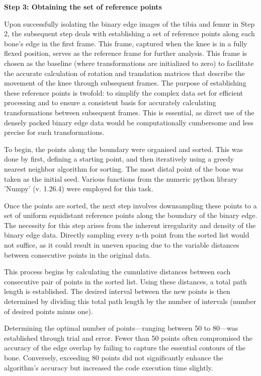 \documentclass{micro-econ-thesis}
\begin{document}
\textbf{Step 3: Obtaining the set of reference points}

Upon successfully isolating the binary edge images of the tibia and femur in Step 2, the subsequent step deals with establishing a set of reference points along each bone's edge in the first frame. This frame, captured when the knee is in a fully flexed position, serves as the reference frame for further analysis.  This frame is chosen as the baseline (where transformations are initialized to zero) to facilitate the accurate calculation of rotation and translation matrices that describe the movement of the knee through subsequent frames. The purpose of establishing these reference points is twofold: to simplify the complex data set for efficient processing and to ensure a consistent basis for accurately calculating transformations between subsequent frames. This is essential, as direct use of the densely packed binary edge data would be computationally cumbersome and less precise for such transformations.

To begin, the points along the boundary were organised and sorted. This was done by first, defining a starting point, and then iteratively using a greedy nearest neighbor algorithm for sorting. The most distal point of the bone was taken as the initial seed. Various functions from the numeric python library 'Numpy' (v. 1.26.4) were employed for this task. 


Once the points are sorted, the next step involves downsampling these points to a set of uniform equidistant reference points along the boundary of the binary edge. The necessity for this step arises from the inherent irregularity and density of the binary edge data. Directly sampling every n-th point from the sorted list would not suffice, as it could result in uneven spacing due to the variable distances between consecutive points in the original data.

This process begins by calculating the cumulative distances between each consecutive pair of points in the sorted list. Using these distances, a total path length is established. The desired interval between the new points is then determined by dividing this total path length by the number of intervals (number of desired points minus one). 

Determining the optimal number of points—ranging between 50 to 80—was established through trial and error. Fewer than 50 points often compromised the accuracy of the edge overlap by failing to capture the essential contours of the bone. Conversely, exceeding 80 points did not significantly enhance the algorithm's accuracy but increased the code execution time slightly. 
\end{document}

